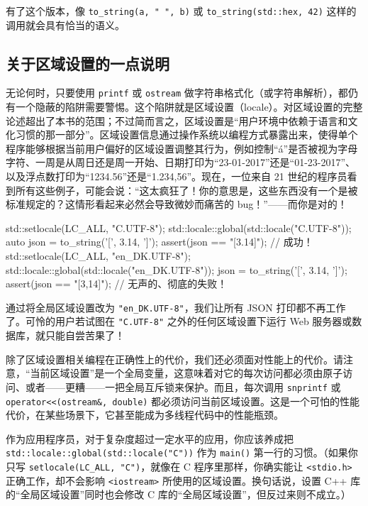 有了这个版本，像 \texttt{to\_\allowbreak{}string(\allowbreak{}a,\allowbreak{} " ",\allowbreak{} b)\allowbreak{}} 或 \texttt{to\_\allowbreak{}string(\allowbreak{}std::\allowbreak{}hex,\allowbreak{} 42)\allowbreak{}} 这样的调用就会具有恰当的语义。

\subsection{关于区域设置的一点说明}

无论何时，只要使用 \texttt{printf} 或 \texttt{ostream} 做字符串格式化（或字符串解析），都仍有一个隐蔽的陷阱需要警惕。这个陷阱就是区域设置（locale）。对区域设置的完整论述超出了本书的范围；不过简而言之，区域设置是“用户环境中依赖于语言和文化习惯的那一部分”。区域设置信息通过操作系统以编程方式暴露出来，使得单个程序能够根据当前用户偏好的区域设置调整其行为，例如控制“á”是否被视为字母字符、一周是从周日还是周一开始、日期打印为“23-01-2017”还是“01-23-2017”、以及浮点数打印为“1234.56”还是“1.234,56”。现在，一位来自 21 世纪的程序员看到所有这些例子，可能会说：“这太疯狂了！你的意思是，这些东西没有一个是被标准规定的？这情形看起来必然会导致微妙而痛苦的 bug！”——而你是对的！

\begin{codebox}[cpp]
    std::setlocale(LC_ALL, "C.UTF-8");
    std::locale::global(std::locale("C.UTF-8"));
    auto json = to_string('[', 3.14, ']');
    assert(json == "[3.14]"); // 成功！
    std::setlocale(LC_ALL, "en_DK.UTF-8");
    std::locale::global(std::locale("en_DK.UTF-8"));
    json = to_string('[', 3.14, ']');
    assert(json == "[3,14]"); // 无声的、彻底的失败！
\end{codebox}

通过将全局区域设置改为 \texttt{"en\_\allowbreak{}DK.\allowbreak{}UTF-8"}，我们让所有 JSON 打印都不再工作了。可怜的用户若试图在 \texttt{"C.\allowbreak{}UTF-8"} 之外的任何区域设置下运行 Web 服务器或数据库，就只能自尝苦果了！

除了区域设置相关编程在正确性上的代价，我们还必须面对性能上的代价。请注意，“当前区域设置”是一个全局变量，这意味着对它的每次访问都必须由原子访问、或者——更糟——一把全局互斥锁来保护。而且，每次调用 \texttt{snprintf} 或 \texttt{operator<<(\allowbreak{}ostream\&,\allowbreak{} double)\allowbreak{}} 都必须访问当前区域设置。这是一个可怕的性能代价，在某些场景下，它甚至能成为多线程代码中的性能瓶颈。

作为应用程序员，对于复杂度超过一定水平的应用，你应该养成把 \texttt{std::\allowbreak{}locale::\allowbreak{}global(\allowbreak{}std::\allowbreak{}locale(\allowbreak{}"C")\allowbreak{})\allowbreak{}} 作为 \texttt{main(\allowbreak{})\allowbreak{}} 第一行的习惯。（如果你只写 \texttt{setlocale(\allowbreak{}LC\_\allowbreak{}ALL,\allowbreak{} "C")\allowbreak{}}，就像在 C 程序里那样，你确实能让 \texttt{<stdio.\allowbreak{}h>\allowbreak{}} 正确工作，却不会影响 \texttt{<iostream>\allowbreak{}} 所使用的区域设置。换句话说，设置 C++ 库的“全局区域设置”同时也会修改 C 库的“全局区域设置”，但反过来则不成立。）


